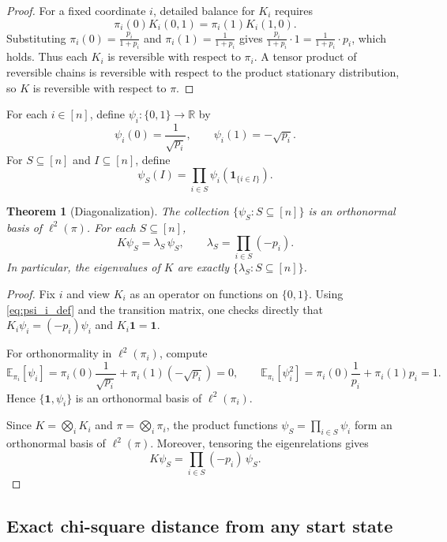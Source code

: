\documentclass[final,3p,times]{elsarticle}
\newtheorem{theorem}{Theorem}[section]
\theoremstyle{definition}
\newcommand{\EE}{\mathbb{E}}
\newcommand{\one}{\mathbf{1}}
\begin{document}
\begin{proof}
For a fixed coordinate $i$, detailed balance for $K_i$ requires
\[
\pi_i(0)K_i(0,1)=\pi_i(1)K_i(1,0).
\]
Substituting $\pi_i(0)=\frac{p_i}{1+p_i}$ and $\pi_i(1)=\frac{1}{1+p_i}$ gives $\frac{p_i}{1+p_i}\cdot 1=\frac{1}{1+p_i}\cdot p_i$, which holds.
Thus each $K_i$ is reversible with respect to $\pi_i$.
A tensor product of reversible chains is reversible with respect to the product stationary distribution, so $K$ is reversible with respect to $\pi$.
\end{proof}

For each $i\in[n]$, define $\psi_i:\{0,1\}\to\mathbb{R}$ by
\begin{equation}\label{eq:psi_i_def}
\psi_i(0)=\frac{1}{\sqrt{p_i}},
\qquad
\psi_i(1)=-\sqrt{p_i}.
\end{equation}
For $S\subseteq[n]$ and $I\subseteq[n]$, define
\begin{equation}\label{eq:psi_S_def}
\psi_S(I)=\prod_{i\in S}\psi_i(\one_{\{i\in I\}}).
\end{equation}

\begin{theorem}[Diagonalization]\label{thm:boolean_diag}
The collection $\{\psi_S: S\subseteq[n]\}$ is an orthonormal basis of $\ell^2(\pi)$.
For each $S\subseteq[n]$,
\[
K\psi_S=\lambda_S\,\psi_S,
\qquad
\lambda_S=\prod_{i\in S}(-p_i).
\]
In particular, the eigenvalues of $K$ are exactly $\{\lambda_S:S\subseteq[n]\}$.
\end{theorem}

\begin{proof}
Fix $i$ and view $K_i$ as an operator on functions on $\{0,1\}$.
Using \eqref{eq:psi_i_def} and the transition matrix, one checks directly that $K_i\psi_i = (-p_i)\psi_i$ and $K_i\one=\one$.

For orthonormality in $\ell^2(\pi_i)$, compute
\[
\EE_{\pi_i}[\psi_i]=\pi_i(0)\frac{1}{\sqrt{p_i}}+\pi_i(1)(-\sqrt{p_i})=0,
\qquad
\EE_{\pi_i}[\psi_i^2]=\pi_i(0)\frac{1}{p_i}+\pi_i(1)p_i=1.
\]
Hence $\{\one,\psi_i\}$ is an orthonormal basis of $\ell^2(\pi_i)$.

Since $K=\bigotimes_i K_i$ and $\pi=\bigotimes_i \pi_i$, the product functions $\psi_S=\prod_{i\in S}\psi_i$ form an orthonormal basis of $\ell^2(\pi)$.
Moreover, tensoring the eigenrelations gives
\[
K\psi_S=\prod_{i\in S}(-p_i)\,\psi_S.
\]
\end{proof}

\subsection{Exact chi-square distance from any start state}
\end{document}
